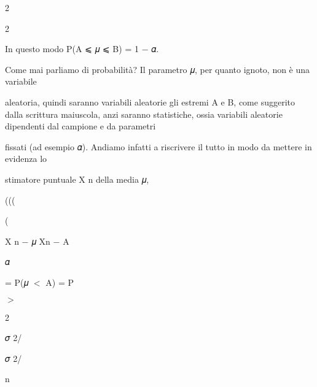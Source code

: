 \documentclass[a4paper,portrait,12pt]{article}
\begin{document}
2


2


\begin{flushleft}
In questo modo P(A ⩽ 𝜇 ⩽ B) = 1 $-$ 𝛼.
\end{flushleft}


\begin{flushleft}
Come mai parliamo di probabilit\`{a}? Il parametro 𝜇, per quanto ignoto, non \`{e} una variabile
\end{flushleft}


\begin{flushleft}
aleatoria, quindi saranno variabili aleatorie gli estremi A e B, come suggerito dalla scrittura maiuscola, anzi saranno statistiche, ossia variabili aleatorie dipendenti dal campione e da parametri
\end{flushleft}


\begin{flushleft}
fissati (ad esempio 𝛼). Andiamo infatti a riscrivere il tutto in modo da mettere in evidenza lo
\end{flushleft}


\begin{flushleft}
stimatore puntuale X n della media 𝜇,
\end{flushleft}





(((


(





\begin{flushleft}
X n $-$ 𝜇 Xn $-$ A
\end{flushleft}


\begin{flushleft}
𝛼
\end{flushleft}


\begin{flushleft}
= P(𝜇 $<$ A) = P
\end{flushleft}


$>$


2


\begin{flushleft}
𝜎 2/
\end{flushleft}


\begin{flushleft}
𝜎 2/
\end{flushleft}


\begin{flushleft}
n
\end{flushleft}
\end{document}
